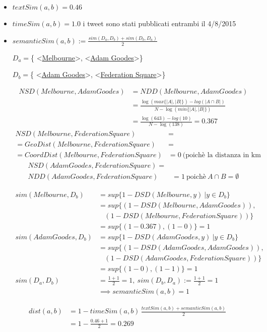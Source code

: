 \begin{itemize}
\item $textSim(a,b)=0.46$ 
\item $timeSim(a,b)=1.0$ i tweet sono stati pubblicati entrambi il 4/8/2015
\item $semanticSim(a,b):=\frac{sim(D_a,D_b)+sim(D_b,D_a)}{2} $



  $D_a=$\{ \textless\href{http://dbpedia.org/resource/Melbourne}{Melbourne}\textgreater, \textless\href{http://dbpedia.org/resource/Adam_Goodes}{Adam Goodes}\textgreater\}
  
  $D_b=$\{ \textless\href{http://dbpedia.org/resource/Adam_Goodes}{Adam Goodes}\textgreater, \textless\href{http://dbpedia.org/resource/Federation_Square}{Federation Square}\textgreater\}
  
\begin{align*}
 NSD(Melbourne,Adam Goodes)&=NDD(Melbourne,Adam Goodes)\\
 &= \frac{\log(max\{|A|,|B|\})-log(|A \cap B|)}{N-\log(min\{|A|,|B|\})}\\
 &= \frac{\log(643)-log(10)}{N-\log(138)}=0.367  
\end{align*} 
\begin{align*}
 NSD(Melbourne,Federation Square)&=\\
 =GeoDist(Melbourne,Federation Square)&=\\
 =CoordDist(Melbourne,Federation Square) &=0 \: \text{(poichè la distanza in km è 0.8)}
\end{align*}  
\begin{align*}
 NSD(Adam Goodes,Federation Square)=&\\
 NDD(Adam Goodes,Federation Square)&=1 \: \text{poichè} \: A \cap B=\emptyset
\end{align*} 

\begin{align*}
 sim(Melbourne,D_b)&=sup\{1-DSD(Melbourne,y)\:| y\in D_b \}\\
	&=sup\{(1-DSD(Melbourne,Adam Goodes)),\\
	&\:\:\:\:(1-DSD(Melbourne,Federation Square))\}\\
	&=sup\{(1-0.367),(1-0)\}=1	\\	  
 sim(Adam Goodes,D_b)&=sup\{1-DSD(Adam Goodes,y)\:| y\in D_b \}\\
	&=sup\{(1-DSD(Adam Goodes,Adam Goodes)),\\
	&\:\:\:\:(1-DSD(Adam Goodes,Federation Square))\}\\
	&=sup\{(1-0),(1-1)\}=1\\		 
sim(D_a,D_b) &=\frac{1+1}{2}=1 ,\: sim(D_b,D_a) :=\frac{1+1}{2}=1\\
&\implies semanticSim(a,b)=1
\end{align*}
\end{itemize} 
 \begin{align*}
dist(a,b)&=1- timeSim(a,b)\,\frac{textSim(a,b)+semanticSim(a,b)}{2}\\
&=1-\frac{0.46+1}{2}=0.269
\end{align*}

